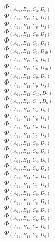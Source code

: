 \documentclass[14pt]{article}
\begin{document}
    $\Phi_{({A}_{14}, {B}_{12}, {C}_{3}, {D}_{6})}$ \\ 
    $\Phi_{({A}_{14}, {B}_{12}, {C}_{6}, {D}_{1})}$ \\ 
    $\Phi_{({A}_{14}, {B}_{12}, {C}_{6}, {D}_{2})}$ \\ 
    $\Phi_{({A}_{14}, {B}_{12}, {C}_{6}, {D}_{3})}$ \\ 
    $\Phi_{({A}_{14}, {B}_{12}, {C}_{7}, {D}_{9})}$ \\ 
    $\Phi_{({A}_{14}, {B}_{12}, {C}_{7}, {D}_{10})}$ \\ 
    $\Phi_{({A}_{14}, {B}_{12}, {C}_{8}, {D}_{9})}$ \\ 
    $\Phi_{({A}_{14}, {B}_{12}, {C}_{8}, {D}_{10})}$ \\ 
    $\Phi_{({A}_{14}, {B}_{12}, {C}_{9}, {D}_{7})}$ \\ 
    $\Phi_{({A}_{14}, {B}_{12}, {C}_{9}, {D}_{8})}$ \\ 
    $\Phi_{({A}_{14}, {B}_{12}, {C}_{10}, {D}_{7})}$ \\ 
    $\Phi_{({A}_{14}, {B}_{12}, {C}_{10}, {D}_{8})}$ \\ 
    $\Phi_{({A}_{14}, {B}_{13}, {C}_{4}, {D}_{6})}$ \\ 
    $\Phi_{({A}_{14}, {B}_{13}, {C}_{6}, {D}_{4})}$ \\ 
    $\Phi_{({A}_{14}, {B}_{13}, {C}_{7}, {D}_{7})}$ \\ 
    $\Phi_{({A}_{14}, {B}_{13}, {C}_{7}, {D}_{8})}$ \\ 
    $\Phi_{({A}_{14}, {B}_{13}, {C}_{8}, {D}_{7})}$ \\ 
    $\Phi_{({A}_{14}, {B}_{13}, {C}_{8}, {D}_{8})}$ \\ 
    $\Phi_{({A}_{14}, {B}_{14}, {C}_{4}, {D}_{6})}$ \\ 
    $\Phi_{({A}_{14}, {B}_{14}, {C}_{6}, {D}_{4})}$ \\ 
    $\Phi_{({A}_{14}, {B}_{14}, {C}_{7}, {D}_{7})}$ \\ 
    $\Phi_{({A}_{14}, {B}_{14}, {C}_{7}, {D}_{8})}$ \\ 
    $\Phi_{({A}_{14}, {B}_{14}, {C}_{8}, {D}_{7})}$ \\ 
    $\Phi_{({A}_{14}, {B}_{14}, {C}_{8}, {D}_{8})}$ \\ 
    $\Phi_{({A}_{14}, {B}_{15}, {C}_{6}, {D}_{7})}$ \\ 
    $\Phi_{({A}_{14}, {B}_{15}, {C}_{6}, {D}_{8})}$ \\ 
    $\Phi_{({A}_{14}, {B}_{15}, {C}_{7}, {D}_{6})}$ \\ 
    $\Phi_{({A}_{14}, {B}_{15}, {C}_{8}, {D}_{6})}$ \\ 
\end{document}
